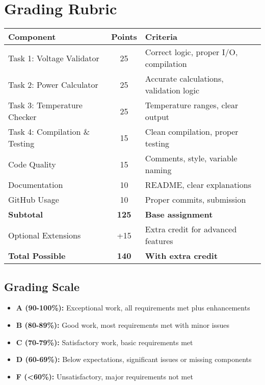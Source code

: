 \documentclass[11pt,a4paper]{article}
\begin{document}
\section{Grading Rubric}

\begin{center}
\begin{tabular}{|l|c|l|}
\hline
\textbf{Component} & \textbf{Points} & \textbf{Criteria} \\
\hline
Task 1: Voltage Validator & 25 & Correct logic, proper I/O, compilation \\
Task 2: Power Calculator & 25 & Accurate calculations, validation logic \\
Task 3: Temperature Checker & 25 & Temperature ranges, clear output \\
Task 4: Compilation \& Testing & 15 & Clean compilation, proper testing \\
Code Quality & 15 & Comments, style, variable naming \\
Documentation & 10 & README, clear explanations \\
GitHub Usage & 10 & Proper commits, submission \\
\hline
\textbf{Subtotal} & \textbf{125} & \textbf{Base assignment} \\
\hline
Optional Extensions & +15 & Extra credit for advanced features \\
\hline
\textbf{Total Possible} & \textbf{140} & \textbf{With extra credit} \\
\hline
\end{tabular}
\end{center}

\subsection{Grading Scale}
\begin{itemize}
    \item \textbf{A (90-100\%):} Exceptional work, all requirements met plus enhancements
    \item \textbf{B (80-89\%):} Good work, most requirements met with minor issues
    \item \textbf{C (70-79\%):} Satisfactory work, basic requirements met
    \item \textbf{D (60-69\%):} Below expectations, significant issues or missing components
    \item \textbf{F (<60\%):} Unsatisfactory, major requirements not met
\end{itemize}
\end{document}
